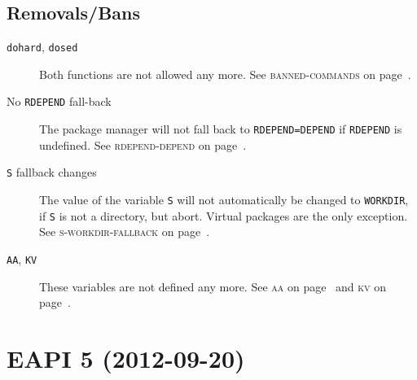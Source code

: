\documentclass[a4paper,nofoldmark]{leaflet}
\newcommand{\code}[1]{\texttt{#1}}
\newcommand{\featureref}[1]{\textsc{#1} on page~\pageref{feat:#1}}
\begin{document}
\subsection{Removals/Bans}
\label{sec:cs:eapi4-removalsbans}
\begin{description}
    \item[\code{dohard}, \code{dosed}] Both functions are not allowed
    any more.  See \featureref{banned-commands}.
    \item[No \code{RDEPEND} fall-back] The package manager will not
    fall back to \code{RDEPEND=DEPEND} if \code{RDEPEND} is undefined.
    See \featureref{rdepend-depend}.
    \item[\code{S} fallback changes] The value of the variable
    \code{S} will not automatically be changed to \code{WORKDIR}, if
    \code{S} is not a directory, but abort.  Virtual packages are the
    only exception.  See \featureref{s-workdir-fallback}.
    \item[\code{AA}, \code{KV}] These variables are not defined
    any more.  See \featureref{aa} and \featureref{kv}.
\end{description}

\section{EAPI 5 (2012-09-20)}
\label{sec:cs:eapi5}
\end{document}
